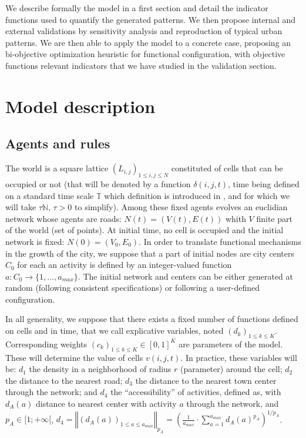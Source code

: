 \documentclass[a4paper,twocolumn,twoside,10pt]{article}
\begin{document}
We describe formally the model in a first section and detail the
indicator functions used to quantify the generated patterns. We then propose internal and
external validations by sensitivity analysis and reproduction of
typical urban patterns. We are then able to apply the model to a
concrete case, proposing an bi-objective optimization heuristic for
functional configuration, with objective functions relevant indicators
that we have studied in the validation section.


\section{Model description}


\subsection{Agents and rules}

The world is a square lattice $(L_{i,j})_{1\leq i,j\leq N}$ constituted
of cells that can be occupied or not (that will be denoted by a function
$\delta(i,j,t)$, time being defined on a standard time scale $\mathbb{T}$
which definition is introduced in \cite{golden2012modeling}, and
for which we will take $\tau\mathbb{N}$, $\tau>0$ to simplify).
Among these fixed agents evolves an euclidian network whose agents
are roads: $N(t)=(V(t),E(t))$ whith $V$ finite part of the world
(set of points). At initial time, no cell is occupied and the initial
network is fixed: $N(0)=(V_{0},E_{0})$. In order to translate functional
mechanisms in the growth of the city, we suppose that a part of initial
nodes are city centers $C_{0}$ for each an activity is defined by
an integer-valued function $a:C_{0}\rightarrow\{1,\ldots,a_{max}\}$.
The initial network and centers can be either generated at random
(following consistent specifications) or following a user-defined
configuration.

In all generality, we suppose that there exists a fixed number of
functions defined on cells and in time, that we call explicative variables,
noted $(d_{k})_{1\leq k\leq K}$. Corresponding weights $(c_{k})_{1\leq k\leq K}\in[0,1]^{K}$
are parameters of the model. These will determine the value of cells
$v(i,j,t)$. In practice, these variables will be: $d_{1}$ the density
in a neighborhood of radius $r$ (parameter) around the cell; $d_{2}$
the distance to the nearest road; $d_{3}$ the distance to the nearest
town center through the network; and $d_{4}$ the ``accessibility''
of activities, defined as, with $d_{A}(a)$ distance to nearest center
with activity $a$ through the network, and $p_{A}\in[1;+\infty[$,
$d_{4}=\left\Vert (d_{A}(a))_{1\leq a\leq a_{max}}\right\Vert _{p_{A}}=\left(\frac{1}{a_{max}}\cdot\sum_{a=1}^{a_{max}}d_{A}(a)^{p_{A}}\right)^{1/p_{A}}$.
\end{document}
